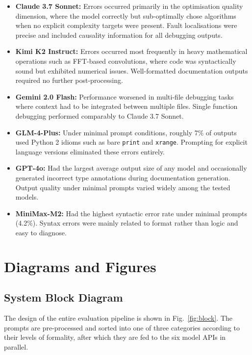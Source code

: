 \documentclass[conference]{IEEEtran}
\begin{document}
\begin{itemize}
  \item \textbf{Claude 3.7 Sonnet:} Errors occurred primarily in the optimisation quality dimension, where the model correctly but sub-optimally chose algorithms when no explicit complexity targets were present. Fault localisations were precise and included causality information for all debugging outputs.

  \item \textbf{Kimi K2 Instruct:} Errors occurred most frequently in heavy mathematical operations such as FFT-based convolutions, where code was syntactically sound but exhibited numerical issues. Well-formatted documentation outputs required no further post-processing.

  \item \textbf{Gemini 2.0 Flash:} Performance worsened in multi-file debugging tasks where context had to be integrated between multiple files. Single function debugging performed comparably to Claude 3.7 Sonnet.

  \item \textbf{GLM-4-Plus:} Under minimal prompt conditions, roughly 7\% of outputs used Python 2 idioms such as bare \texttt{print} and \texttt{xrange}. Prompting for explicit language versions eliminated these errors entirely.

  \item \textbf{GPT-4o:} Had the largest average output size of any model and occasionally generated incorrect type annotations during documentation generation. Output quality under minimal prompts varied widely among the tested models.

  \item \textbf{MiniMax-M2:} Had the highest syntactic error rate under minimal prompts (4.2\%). Syntax errors were mainly related to format rather than logic and easy to diagnose.
\end{itemize}

\section{Diagrams and Figures}
\label{sec:diagrams}

\subsection{System Block Diagram}

The design of the entire evaluation pipeline is shown in Fig.~\ref{fig:block}. The prompts are pre-processed and sorted into one of three categories according to their levels of formality, after which they are fed to the six model APIs in parallel.
\end{document}
